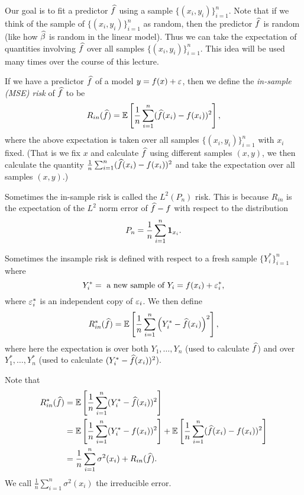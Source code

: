 Our goal is to fit a predictor $\widehat{f}$ using a sample $\{(x_i,y_i)\}_{i=1}^n$. Note that if we think of the sample of $\{(x_i,y_i)\}_{i=1}^n$ as random, then the predictor $\widehat{f}$ is random (like how $\widehat{\beta}$ is random in the linear model). Thus we can take the expectation of quantities involving $\widehat{f}$ over all samples $\{(x_i,y_i)\}_{i=1}^n$. This idea will be used many times over the course of this lecture. 
\begin{defn}
    If we have a predictor $\widehat{f}$ of a model $y = f(x)+\varepsilon$, then we define the \emph{in-sample (MSE) risk} of $\widehat{f}$ to be 
    \[R_{in}(\widehat{f}) = {\mathbb{E}}\left[\frac{1}{n}\sum_{i=1}^n (\widehat{f}(x_i)-f(x_i))^2\right], \]
    where the above expectation is taken over all samples $\{(x_i,y_i)\}_{i=1}^n$ with $x_i$ fixed. (That is we fix $x$ and calculate $\widehat{f}$ using different samples $(x,y)$, we then calculate the quantity $\frac{1}{n}\sum_{i=1}^n (\widehat{f}(x_i)-f(x_i))^2$ and take the expectation over all samples $(x,y)$.)
\end{defn}
\begin{aside}
    Sometimes the in-sample risk is called the $L^2(P_n)$ risk. This is because $R_{in}$ is the expectation of the $L^2$ norm error of $\widehat{f}-f$ with respect to the distribution
    \[P_n = \frac{1}{n}\sum_{i=1}^n {{\bf 1}}_{x_i}.\]
\end{aside}
\begin{defn}
    Sometimes the insample risk is defined with respect to a fresh sample $\{Y_i^*\}_{i=1}^n$ where 
    \[Y_i^* = \text{ a new sample of } Y_i = f(x_i) + \varepsilon_i^*, \]
    where $\varepsilon_i^*$ is an independent copy of $\varepsilon_i$. We then define
    \[R_{in}^*(\widehat{f}) = {\mathbb{E}}\left[\frac{1}{n}\sum_{i=1}^n \left(Y_i^*-\widehat{f}(x_i)\right)^2\right], \]
    where here the expectation is over both $Y_1,\ldots, Y_n$ (used to calculate $\widehat{f}$) and over $Y_1^*,\ldots, Y_n^*$ (used to calculate $(Y_i^*-\widehat{f}(x_i))^2$).
\end{defn}
Note that 
\begin{align}
    R^*_{in}(\widehat{f}) &= {\mathbb{E}}\left[\frac{1}{n} \sum_{i=1}^n (Y_i^*-\widehat{f}(x_i))^2\right]\\
    &={\mathbb{E}}\left[\frac{1}{n} \sum_{i=1}^n (Y_i^*-f(x_i))^2\right]+{\mathbb{E}}\left[\frac{1}{n}\sum_{i=1}^n (\widehat{f}(x_i)-f(x_i))^2\right]\\
    &=\frac{1}{n}\sum_{i=1}^n \sigma^2(x_i)+R_{in}(\widehat{f}).
\end{align}
We call $\frac{1}{n}\sum_{i=1}^n \sigma^2(x_i)$ the irreducible error. 

